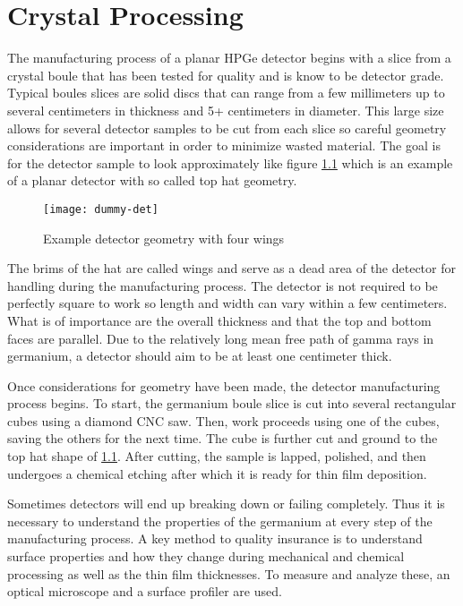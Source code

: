 \chapter{Crystal Processing}
The manufacturing process of a planar HPGe detector begins with a slice from a crystal boule that has been tested for quality and is know to be detector grade.
Typical boules slices are solid discs that can range from a few millimeters up to several centimeters in thickness and 5+ centimeters in diameter.
This large size allows for several detector samples to be cut from each slice so careful geometry considerations are important in order to minimize wasted material.
The goal is for the detector sample to look approximately like figure \ref{fig:dummydet} which is an example of a planar detector with so called top hat geometry.
\begin{figure}[htpb]
\centering
\texttt{[image: dummy-det]}
\caption{Example detector geometry with four wings}
\label{fig:dummydet}
\end{figure}
The brims of the hat are called wings and serve as a dead area of the detector for handling during the manufacturing process.
The detector is not required to be perfectly square to work so length and width can vary within a few centimeters.
What is of importance are the overall thickness and that the top and bottom faces are parallel.
Due to the relatively long mean free path of gamma rays in germanium, a detector should aim to be at least one centimeter thick.

Once considerations for geometry have been made, the detector manufacturing process begins.
To start, the germanium boule slice is cut into several rectangular cubes using a diamond CNC saw.
Then, work proceeds using one of the cubes, saving the others for the next time.
The cube is further cut and ground to the top hat shape of \ref{fig:dummydet}.
After cutting, the sample is lapped, polished, and then undergoes a chemical etching after which it is ready for thin film deposition.

Sometimes detectors will end up breaking down or failing completely.
Thus it is necessary to understand the properties of the germanium at every step of the manufacturing process.
A key method to quality insurance is to understand surface properties and how they change during mechanical and chemical processing as well as the thin film thicknesses.
To measure and analyze these, an optical microscope and a surface profiler are used.

